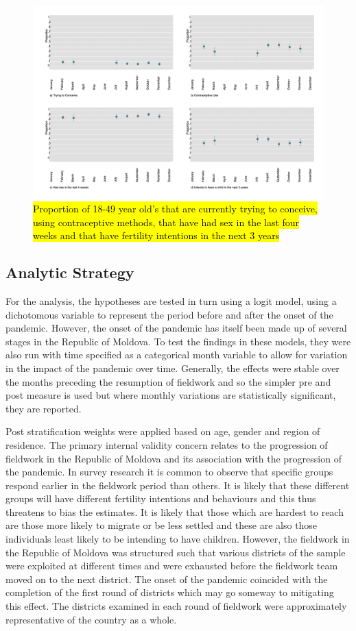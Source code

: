 \documentclass[10pt,letterpaper]{article}
\begin{document}
\begin{figure}
\centering
\includegraphics[width=\textwidth]{fig3.png}
\caption{\hl{Proportion of 18-49 year old's that are currently trying to conceive, using contraceptive methods, that have had sex in the last four weeks and that have fertility intentions in the next 3 years}}
\label{fig:deps_month}
\end{figure}
\subsection*{Analytic Strategy}
For the analysis, the hypotheses are tested in turn using a logit model, using a dichotomous variable to represent the period before and after the onset of the pandemic. However, the onset of the pandemic has itself been made up of several stages in the Republic of Moldova. To test the findings in these models, they were also run with time specified as a categorical month variable to allow for variation in the impact of the pandemic over time. Generally, the effects were stable over the months preceding the resumption of fieldwork and so the simpler pre and post measure is used but where monthly variations are statistically significant, they are reported. 

Post stratification weights were applied based on age, gender and region of residence. The primary internal validity concern relates to the progression of fieldwork in the Republic of Moldova and its association with the progression of the pandemic. In survey research it is common to observe that specific groups respond earlier in the fieldwork period than others. It is likely that these different groups will have different fertility intentions and behaviours and this thus threatens to bias the estimates. It is likely that those which are hardest to reach are those more likely to migrate or be less settled and these are also those individuals least likely to be intending to have children. However, the fieldwork in the Republic of Moldova was structured such that various districts of the sample were exploited at different times and were exhausted before the fieldwork team moved on to the next district. The onset of the pandemic coincided with the completion of the first round of districts which may go someway to mitigating this effect. The districts examined in each round of fieldwork were approximately representative of the country as a whole.
\end{document}
